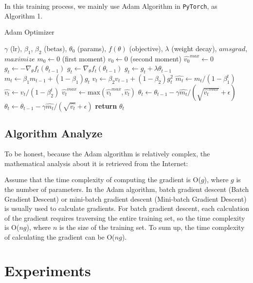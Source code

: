 \documentclass[lettersize,journal]{IEEEtran}
\begin{document}
In this training process, we mainly use Adam Algorithm in \texttt{PyTorch}, as Algorithm 1.
\begin{algorithm}
\caption{Adam Optimizer}
\begin{algorithmic}[1]
\Require $\gamma$ (lr), $\beta_1$, $\beta_2$ (betas), $\theta_0$ (params), $f(\theta)$ (objective), $\lambda$ (weight decay), $amsgrad$, $maximize$
\State $m_0 \gets 0$ (first moment)
\State $v_0 \gets 0$ (second moment)
\State $\widehat{v_0}^{max} \gets 0$
        \State $g_t \gets -\nabla_{\theta} f_t(\theta_{t-1})$
    \Else
        \State $g_t \gets \nabla_{\theta} f_t(\theta_{t-1})$
    \EndIf
        \State $g_t \gets g_t + \lambda \theta_{t-1}$
    \EndIf
    \State $m_t \gets \beta_1 m_{t-1} + (1 - \beta_1) g_t$
    \State $v_t \gets \beta_2 v_{t-1} + (1-\beta_2) g^2_t$
    \State $\widehat{m_t} \gets m_t / (1-\beta_1^t)$
    \State $\widehat{v_t} \gets v_t / (1-\beta_2^t)$
        \State $\widehat{v_t}^{max} \gets \mathrm{max}(\widehat{v_t}^{max}, \widehat{v_t})$
        \State $\theta_t \gets \theta_{t-1} - \gamma \widehat{m_t} / (\sqrt{\widehat{v_t}^{max}} + \epsilon)$
    \Else
        \State $\theta_t \gets \theta_{t-1} - \gamma \widehat{m_t} / (\sqrt{\widehat{v_t}} + \epsilon)$
    \EndIf
\EndFor
\State \textbf{return} $\theta_{t}$
\end{algorithmic}
\end{algorithm}

\subsection{Algorithm Analyze}

To be honest, because the Adam algorithm is relatively complex, the mathematical analysis about it is retrieved from the Internet:

Assume that the time complexity of computing the gradient is O($g$), where $g$ is the number of parameters. In the Adam algorithm, batch gradient descent (Batch Gradient Descent) or mini-batch gradient descent (Mini-batch Gradient Descent) is usually used to calculate gradients. For batch gradient descent, each calculation of the gradient requires traversing the entire training set, so the time complexity is O($ng$), where $n$ is the size of the training set. To sum up, the time complexity of calculating the gradient can be O($ng$).

\section{Experiments}
\end{document}

